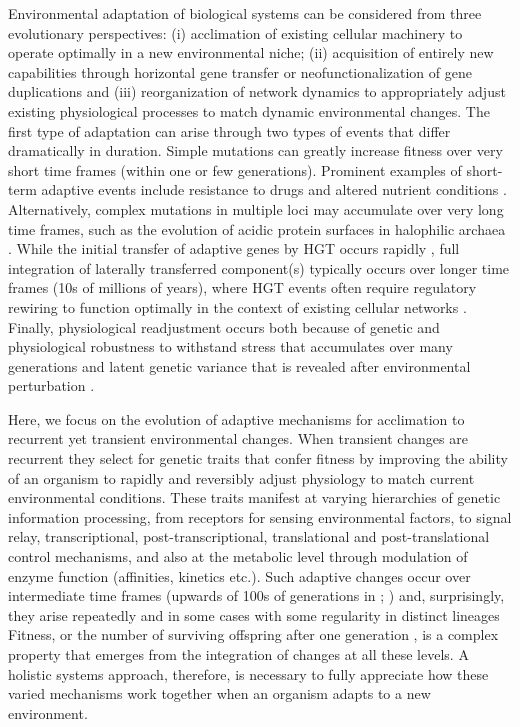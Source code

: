 Environmental adaptation of biological systems can be considered from three evolutionary perspectives: (i) acclimation of existing cellular machinery to operate optimally in a new environmental niche; (ii) acquisition of entirely new capabilities through horizontal gene transfer or neofunctionalization of gene duplications and (iii) reorganization of network dynamics to appropriately adjust existing physiological processes to match dynamic environmental changes. The first type of adaptation can arise through two types of events that differ dramatically in duration. Simple mutations can greatly increase fitness over very short time frames (within one or few generations). Prominent examples of short-term adaptive events include resistance to drugs \cite{schrag_adaptation_1997,spain_adaptation_1983} and altered nutrient conditions \cite{finkel_evolution_1999}. Alternatively, complex mutations in multiple loci may accumulate over very long time frames, such as the evolution of acidic protein surfaces in halophilic archaea \cite{kennedy_understanding_2001,gribaldo_origin_2006,soppa_genomics_2008}.  While the initial transfer of adaptive genes by HGT occurs rapidly \cite{babic_direct_2008}, full integration of laterally transferred component(s) typically occurs over longer time frames (10s of millions of years), where HGT events often require regulatory rewiring to function optimally in the context of existing cellular networks \cite{lercher_integration_2008}.  Finally, physiological readjustment occurs both because of genetic and physiological robustness to withstand stress that accumulates over many generations and latent genetic variance that is revealed after environmental perturbation \cite{rutherford_genotype_2000}. 

Here, we focus on the evolution of adaptive mechanisms for acclimation to recurrent yet transient environmental changes.  When transient changes are recurrent they select for genetic traits that confer fitness by improving the ability of an organism to rapidly and reversibly adjust physiology to match current environmental conditions. These traits manifest at varying hierarchies of genetic information processing, from receptors for sensing environmental factors, to signal relay, transcriptional, post-transcriptional, translational and post-translational control mechanisms, and also at the metabolic level through modulation of enzyme function (affinities, kinetics etc.).  Such adaptive changes occur over intermediate time frames (upwards of 100s of generations in \eco; \cite{tagkopoulos_predictive_2008}) and, surprisingly, they arise repeatedly and in some cases with some regularity in distinct lineages \cite{chaffron_global_2010} Fitness, or the number of surviving offspring after one generation \cite{barton_evolution_2007}, is a complex property that emerges from the integration of changes at all these levels. A holistic systems approach, therefore, is necessary to fully appreciate how these varied mechanisms work together when an organism adapts to a new environment.  

